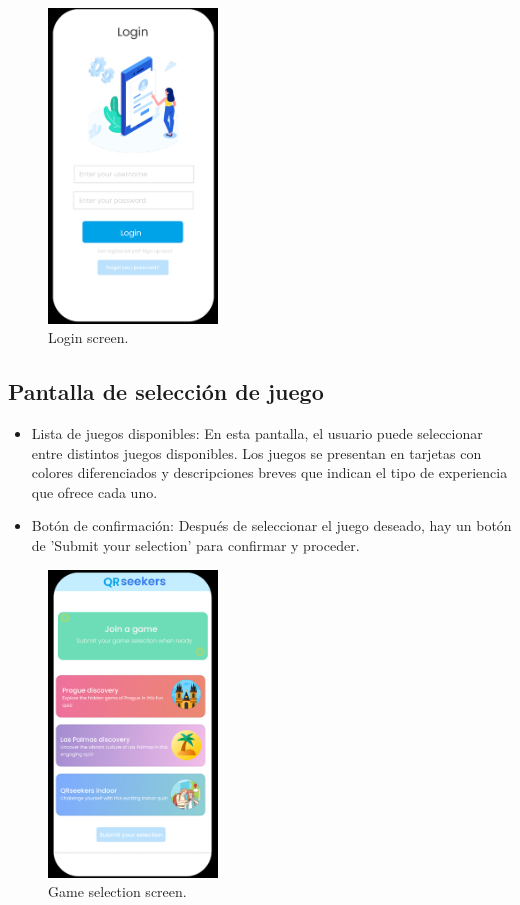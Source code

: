 \documentclass[letterpaper, 12pt]{report}
\begin{document}
\begin{figure}[H]
\centering
\includegraphics[width=0.4\textwidth]{figure3.png}
\caption{Login screen.}
\label{fig:1}
\end{figure}

\subsection{Pantalla de selección de juego}

\begin{itemize}
    \item Lista de juegos disponibles: En esta pantalla, el usuario puede seleccionar entre distintos juegos disponibles. Los juegos se presentan en tarjetas con colores diferenciados y descripciones breves que indican el tipo de experiencia que ofrece cada uno. 
    \item Botón de confirmación: Después de seleccionar el juego deseado, hay un botón de 'Submit your selection' para confirmar y proceder.
\end{itemize}

\begin{figure}[H]
\centering
\includegraphics[width=0.4\textwidth]{figure4.png}
\caption{Game selection screen.}
\label{fig:1}
\end{figure}
\end{document}
